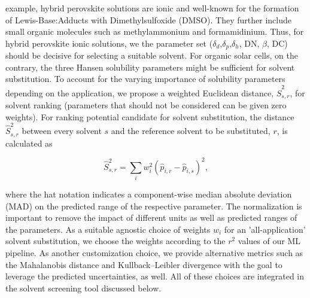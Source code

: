 \documentclass[
  english,        %
  font=times,     %
  onecolumn,      %
]{article}
\begin{document}
example, hybrid perovskite solutions are ionic and well-known for the formation of Lewis-Base:Adducts with Dimethylsulfoxide (DMSO)\cite{liRationalDesignLewis2023,leeLewisAcidBase2016}. They further include small organic molecules such as methylammonium and formamidinium. Thus, for hybrid perovskite ionic solutions, we the parameter set ($\delta_d$,$\delta_p$,$\delta_h$, DN, $\beta$,  DC)  should be decisive for selecting a suitable solvent. For organic solar cells, on the contrary, the three Hansen solubility parameters might be sufficient for solvent substitution. To account for the varying importance of solubility parameters depending on the application, we propose a weighted Euclidean distance, $\hat{S}_{s,r}^2$, for solvent ranking (parameters that should not be considered can be given zero weights).  For ranking potential candidate for solvent substitution, the distance $\hat{S}_{s,r}^2$ between every solvent $s$ and the reference solvent to be substituted, $r$,  is calculated as

\begin{equation}
\hat{S}_{s,r}^2 = \sum _{i} w_i^2\left( \hat{p}_{i,r}-\hat{p}_{i,s} \right)^2,
\label{eq:dist}
\end{equation}

where the hat notation indicates a component-wise median absolute deviation (MAD) on the predicted range of the respective parameter. The normalization is important to remove the impact of different units as well as predicted ranges of the parameters.  As a suitable agnostic choice of weights $w_i$ for an 'all-application' solvent substitution, we choose the weights according to the $r^2$ values of our ML pipeline. As another customization choice, we provide alternative metrics such as the Mahalanobis distance and Kullback–Leibler divergence with the goal to leverage the predicted uncertainties, as well.  All of these choices are integrated in the solvent screening tool discussed below.
\end{document}
